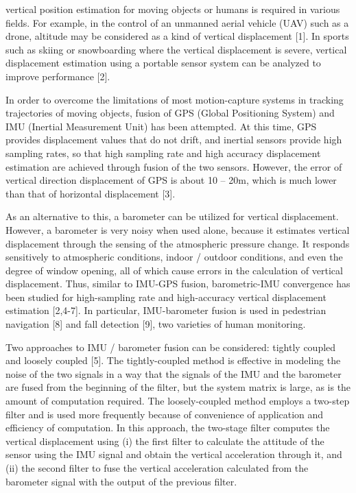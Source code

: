 \documentclass[10pt,journal,compsoc]{IEEEtran}
\begin{document}
\maketitle


\IEEEdisplaynontitleabstractindextext
\IEEEpeerreviewmaketitle


 vertical position estimation for moving objects or
humans is required in various fields. For example, in the control of an
unmanned aerial vehicle (UAV) such as a drone, altitude may be considered as a
kind of vertical displacement [1].  In sports such as skiing or
snowboarding where the vertical displacement is severe, vertical displacement
estimation using a portable sensor system can be analyzed to improve
performance [2].

In order to overcome the limitations of most motion-capture systems in
tracking trajectories of moving objects, fusion of GPS (Global Positioning
System) and IMU (Inertial Measurement Unit) has been attempted.  At this time,
GPS provides displacement values that do not drift, and inertial sensors
provide high sampling rates, so that high sampling rate and high accuracy
displacement estimation are achieved through fusion of the two sensors.
However, the error of vertical direction displacement of GPS is about 10 --
20m, which is much lower than that of horizontal displacement [3]. 

As an alternative to this, a barometer can be utilized for vertical
displacement. However, a barometer is very noisy when used alone, because
it estimates vertical displacement through the sensing of the
atmospheric pressure change. It responds sensitively to atmospheric conditions,
indoor / outdoor conditions, and even the degree of window opening, all of
which cause errors in the calculation of vertical displacement. Thus, similar
to IMU-GPS fusion, barometric-IMU convergence has been studied for
high-sampling rate and high-accuracy vertical displacement estimation [2,4-7].
In particular, IMU-barometer fusion is used in pedestrian navigation [8]
and fall detection [9], two varieties of human monitoring.

Two approaches to IMU / barometer fusion can be considered: tightly
coupled and loosely coupled [5]. The tightly-coupled method is effective in
modeling the noise of the two signals in a way that the signals of the IMU and
the barometer are fused from the beginning of the filter, but the system matrix
is large, as is the amount of computation required.  The loosely-coupled method
employs a two-step filter and is used more frequently because of convenience
of application and efficiency of computation. In this approach, the two-stage
filter computes the vertical displacement using (i) the first filter to
calculate the attitude of the sensor using the IMU signal and obtain the
vertical acceleration through it, and (ii) the second filter to fuse the
vertical acceleration calculated from the barometer signal with the output of
the previous filter.
\end{document}
